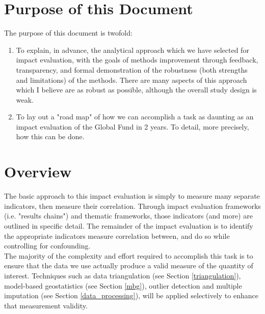 \documentclass[twocolumn]{bmcart}%
\begin{document}
\section{Purpose of this Document}
The purpose of this document is twofold:

\begin{enumerate}
  \item To explain, in advance, the analytical approach which we have selected for impact evaluation, with the goals of methods improvement through feedback, transparency, and formal demonstration of the robustness (both strengths and limitations) of the methods. There are many aspects of this approach which I believe are as robust as possible, although the overall study design is weak.
  \item To lay out a "road map" of how we can accomplish a task as daunting as an impact evaluation of the Global Fund in 2 years. To detail, more precisely, how this can be done.
\end{enumerate}


\section{Overview}
The basic approach to this impact evaluation is simply to measure many separate indicators, then measure their correlation. Through impact evaluation frameworks (i.e. "results chains") and thematic frameworks, those indicators (and more) are outlined in specific detail. The remainder of the impact evaluation is to identify the appropriate indicators measure correlation between, and do so while controlling for confounding. \\

The majority of the complexity and effort required to accomplish this task is to ensure that the data we use actually produce a valid measure of the quantity of interest. Techniques such as data triangulation (see Section \ref{triangulation}), model-based geostatistics (see Section \ref{mbg}), outlier detection and multiple imputation (see Section \ref{data_processing}), will be applied selectively to enhance that measurement validity. \\
\end{document}
